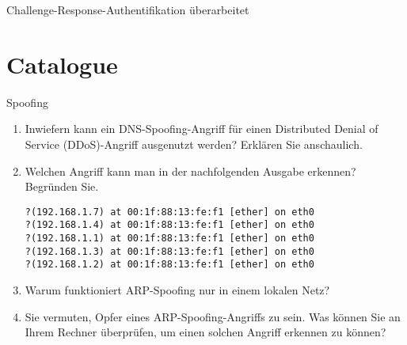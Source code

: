 \documentclass{article}
\begin{document}
\begin{exercise}{Challenge-Response-Authentifikation überarbeitet}
  \begin{solution}
  \end{solution}
\end{exercise}


%



\section{Catalogue}

\setcounter{subsection}{46}
\begin{exercise}{Spoofing}
  \begin{enumerate}
    \item Inwiefern kann ein DNS-Spoofing-Angriff für einen Distributed Denial of Service (DDoS)-Angriff ausgenutzt werden? Erklären Sie anschaulich.
    \item Welchen Angriff kann man in der nachfolgenden Ausgabe erkennen? Begründen Sie.
      \begin{center}
        \texttt{?(192.168.1.7) at 00:1f:88:13:fe:f1 [ether] on eth0} \\
        \texttt{?(192.168.1.4) at 00:1f:88:13:fe:f1 [ether] on eth0} \\
        \texttt{?(192.168.1.1) at 00:1f:88:13:fe:f1 [ether] on eth0} \\
        \texttt{?(192.168.1.3) at 00:1f:88:13:fe:f1 [ether] on eth0} \\
        \texttt{?(192.168.1.2) at 00:1f:88:13:fe:f1 [ether] on eth0}
      \end{center}
    \item Warum funktioniert ARP-Spoofing nur in einem lokalen Netz?
    \item Sie vermuten, Opfer eines ARP-Spoofing-Angriffs zu sein. Was können Sie an Ihrem Rechner überprüfen, um einen solchen Angriff erkennen zu können?
  \end{enumerate}


\end{exercise}
\end{document}
